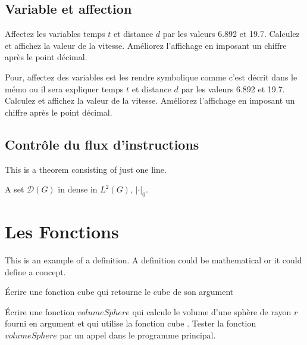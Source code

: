 \subsection{Variable et affection}

\begin{exercise}
Affectez les variables temps $t$ et distance $d$ par les valeurs 6.892 et 19.7. Calculez et affichez la valeur de la vitesse. Améliorez l’affichage en imposant un chiffre après le point décimal.
\end{exercise}

\begin{solution}
Pour, affectez des variables est les rendre symbolique comme c'est décrit dans le mémo ou il 
sera expliquer temps $t$ et distance $d$ par les valeurs 6.892 et 19.7. Calculez et affichez la 
valeur de la vitesse. Améliorez l’affichage en imposant un chiffre après le point décimal.
\end{solution}

\subsection{Contrôle du flux d’instructions}
This is a theorem consisting of just one line.

\begin{exercise}
A set $\mathcal{D}(G)$ in dense in $L^2(G)$, $|\cdot|_0$. 
\end{exercise}
\begin{solution}
\end{solution}

\section{Les Fonctions}

This is an example of a definition. A definition could be mathematical or it could define a concept.

\begin{exercise}
Écrire une fonction cube qui retourne le cube de son argument
\end{exercise}

\begin{exercise}
Écrire une fonction $volumeSphere$ qui calcule le volume d’une sphère de rayon $r$ fourni
en argument et qui utilise la fonction cube .
Tester la fonction $volumeSphere$ par un appel dans le programme principal.
\end{exercise}

